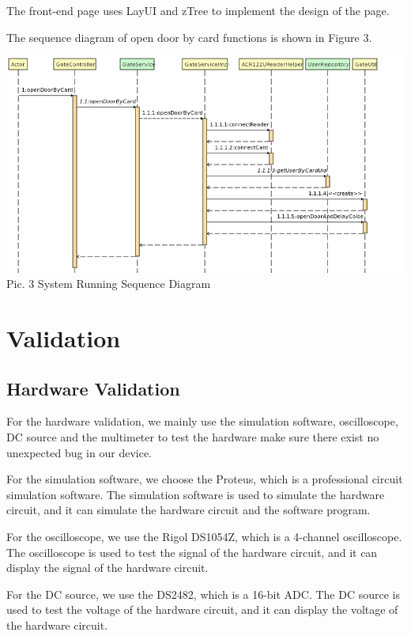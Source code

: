 \documentclass[11pt, a4paper]{article}
\begin{document}
The front-end page uses LayUI and zTree to implement the design of the page. 

The sequence diagram of open door by card functions is shown in Figure 3.

\newpage
\begin{center}

\includegraphics[scale=0.3]{pic3.png} \\
Pic. 3  System Running Sequence Diagram

\end{center}

\section{Validation}
\subsection{Hardware Validation}

For the hardware validation, we mainly use the simulation software, oscilloscope, DC source and the multimeter to test the hardware make sure there exist no unexpected bug in our device.

For the simulation software, we choose the Proteus, which is a professional circuit simulation software.
The simulation software is used to simulate the hardware circuit, and it can simulate the hardware circuit and the software program.

For the oscilloscope, we use the Rigol DS1054Z, which is a 4-channel oscilloscope.
The oscilloscope is used to test the signal of the hardware circuit, and it can display the signal of the hardware circuit.

For the DC source, we use the DS2482, which is a 16-bit ADC.
The DC source is used to test the voltage of the hardware circuit, and it can display the voltage of the hardware circuit.
\end{document}
